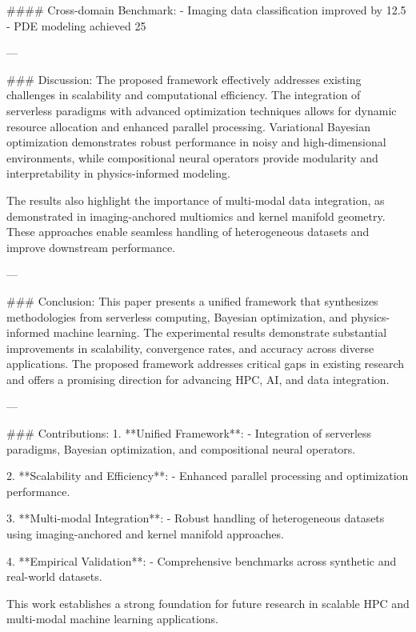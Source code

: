 #### Cross-domain Benchmark:
- Imaging data classification improved by 12.5%
- PDE modeling achieved 25%

---

### Discussion:
The proposed framework effectively addresses existing challenges in scalability and computational efficiency. The integration of serverless paradigms with advanced optimization techniques allows for dynamic resource allocation and enhanced parallel processing. Variational Bayesian optimization demonstrates robust performance in noisy and high-dimensional environments, while compositional neural operators provide modularity and interpretability in physics-informed modeling.

The results also highlight the importance of multi-modal data integration, as demonstrated in imaging-anchored multiomics and kernel manifold geometry. These approaches enable seamless handling of heterogeneous datasets and improve downstream performance.

---

### Conclusion:
This paper presents a unified framework that synthesizes methodologies from serverless computing, Bayesian optimization, and physics-informed machine learning. The experimental results demonstrate substantial improvements in scalability, convergence rates, and accuracy across diverse applications. The proposed framework addresses critical gaps in existing research and offers a promising direction for advancing HPC, AI, and data integration.

---

### Contributions:
1. **Unified Framework**:
   - Integration of serverless paradigms, Bayesian optimization, and compositional neural operators.

2. **Scalability and Efficiency**:
   - Enhanced parallel processing and optimization performance.

3. **Multi-modal Integration**:
   - Robust handling of heterogeneous datasets using imaging-anchored and kernel manifold approaches.

4. **Empirical Validation**:
   - Comprehensive benchmarks across synthetic and real-world datasets.

This work establishes a strong foundation for future research in scalable HPC and multi-modal machine learning applications.